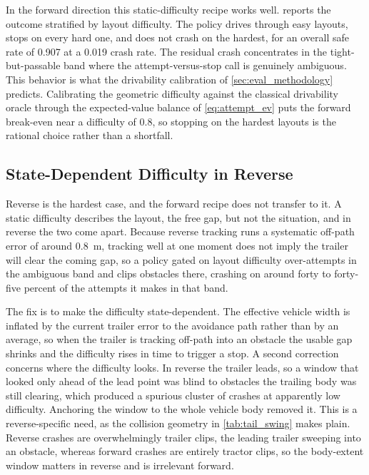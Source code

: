 In the forward direction this static-difficulty recipe works well.  reports the outcome stratified by layout difficulty. The policy drives through easy layouts, stops on every hard one, and does not crash on the hardest, for an overall safe rate of 0.907 at a 0.019 crash rate. The residual crash concentrates in the tight-but-passable band where the attempt-versus-stop call is genuinely ambiguous. This behavior is what the drivability calibration of \cref{sec:eval_methodology} predicts. Calibrating the geometric difficulty against the classical drivability oracle through the expected-value balance of \cref{eq:attempt_ev} puts the forward break-even near a difficulty of $0.8$, so stopping on the hardest layouts is the rational choice rather than a shortfall.



\subsection{State-Dependent Difficulty in Reverse}
\label{sec:reverse_dynamic_difficulty}

Reverse is the hardest case, and the forward recipe does not transfer to it. A static difficulty describes the layout, the free gap, but not the situation, and in reverse the two come apart. Because reverse tracking runs a systematic off-path error of around $0.8$~m, tracking well at one moment does not imply the trailer will clear the coming gap, so a policy gated on layout difficulty over-attempts in the ambiguous band and clips obstacles there, crashing on around forty to forty-five percent of the attempts it makes in that band.

The fix is to make the difficulty state-dependent. The effective vehicle width is inflated by the current trailer error to the avoidance path rather than by an average, so when the trailer is tracking off-path into an obstacle the usable gap shrinks and the difficulty rises in time to trigger a stop. A second correction concerns where the difficulty looks. In reverse the trailer leads, so a window that looked only ahead of the lead point was blind to obstacles the trailing body was still clearing, which produced a spurious cluster of crashes at apparently low difficulty. Anchoring the window to the whole vehicle body removed it. This is a reverse-specific need, as the collision geometry in \cref{tab:tail_swing} makes plain. Reverse crashes are overwhelmingly trailer clips, the leading trailer sweeping into an obstacle, whereas forward crashes are entirely tractor clips, so the body-extent window matters in reverse and is irrelevant forward.

